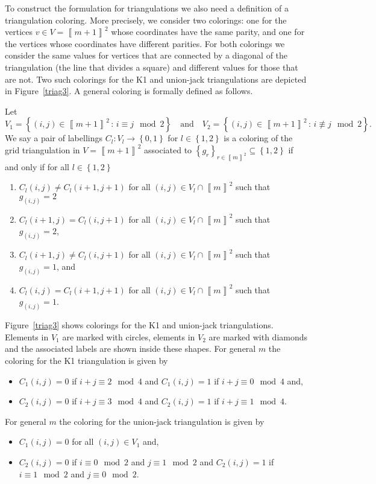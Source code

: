 \documentclass[mnsc]{informs3}
\newcommand{\set}[1]{\left\{#1\right\}}                     %
\newcommand{\bra}[1]{\left(#1\right)}
\newcommand{\sidx}[1]{\left\llbracket     #1 \right\rrbracket}
\begin{document}
To construct the formulation for triangulations we also need a definition of a triangulation coloring. More precisely, we consider two colorings: one for the vertices $v\in V=\sidx{m+1}^2$ whose coordinates have the same parity, and one for the vertices whose coordinates have different parities. For both colorings we consider the same values for vertices that are connected by a diagonal of the triangulation (the line that divides a square) and different values for those that are not. Two such colorings for the K1 and union-jack triangulations are depicted in Figure~\ref{triag3}. A general coloring is formally defined as follows. 
\begin{definition} Let 
\[
V_1=\set{\bra{i,j}\in\sidx{m+1}^2\,: \, i\equiv j \mod 2 }\quad\text{and}\quad
V_2=\set{\bra{i,j}\in\sidx{m+1}^2\,: \, i\not\equiv j \mod 2 }.\] We say a pair of labellings $C_l:V_l\to \set{0,1}$ for $l\in\set{1,2}$ is a coloring of the grid triangulation in $V=\sidx{m+1}^2$ associated to   $\set{g_r}_{r\in\sidx{m}^2}\subseteq \set{1,2}$ if and only if for all $l\in \set{1,2}$
\begin{enumerate}
\item  $C_l{\bra{i,j}}\neq C_l{\bra{i+1,j+1}}$ for all $\bra{i,j}\in V_l\cap \sidx{m}^2$ such that $g_{\bra{i,j}}=2$
\item  $C_l{\bra{i+1,j}}= C_l{\bra{i,j+1}}$ for all $\bra{i,j}\in V_l\cap \sidx{m}^2$ such that $g_{\bra{i,j}}=2$, 
\item  $C_l{\bra{i+1,j}}\neq C_l{\bra{i,j+1}}$ for all $\bra{i,j}\in V_l\cap \sidx{m}^2$ such that $g_{\bra{i,j}}=1$, and
\item    $C_l{\bra{i,j}}= C_l{\bra{i+1,j+1}}$ for all $\bra{i,j}\in V_l\cap \sidx{m}^2$ such that $g_{\bra{i,j}}=1$.
\end{enumerate}
\end{definition}
\begin{example}
Figure~\ref{triag3} shows colorings  for the K1 and union-jack triangulations. Elements in $V_1$ are marked with circles, elements in $V_2$ are marked with diamonds and the associated labels are shown inside these shapes. For general $m$ the coloring for the K1 triangulation is given by 
\begin{itemize}
\item $C_1\bra{i,j}=0$ if $i+j \equiv 2 \mod 4$ and $C_1\bra{i,j}=1$ if $i+j \equiv 0 \mod 4$ and, 
\item  $C_2\bra{i,j}=0$ if $i+j \equiv 3 \mod 4$ and $C_2\bra{i,j}=1$ if $i+j \equiv 1 \mod 4$. 
\end{itemize}
For general $m$ the coloring for the union-jack triangulation is given by 
\begin{itemize}
\item $C_1\bra{i,j}=0$ for all $\bra{i,j}\in V_1$ and, 
\item  $C_2\bra{i,j}=0$ if $i \equiv 0 \mod 2$ and $j \equiv 1 \mod 2$ and $C_2\bra{i,j}=1$ if $i \equiv 1 \mod 2$ and $j \equiv 0 \mod 2$. 
\end{itemize}
\end{example}
\end{document}
